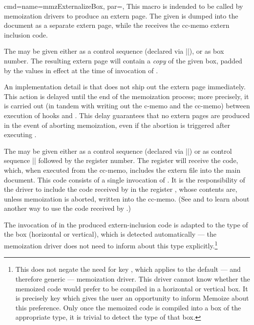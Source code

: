 \documentclass[a4paper,11pt]{article}
\begin{document}
\begin{doc}{
    cmd={name=mmzExternalizeBox, par=},
  }
  This macro is indended to be called by memoization drivers to produce an
  extern page.  The given  is dumped into the document as a separate
  extern page, while the  receives the cc-memo extern
  inclusion code.

  The  may be given either as a control sequence (declared via
  |\newbox|), or as box number.  The resulting extern page will contain a
  \emph{copy} of the given box, padded by the  values in effect
  at the time of invocation of .

  An implementation detail is that  does not ship out
  the extern page immediately.  This action is delayed until the end of the
  memoization process; more precisely, it is carried out (in tandem with
  writing out the c-memo and the cc-memo) between execution of hooks  and .  This delay guarantees
  that no extern pages are produced in the event of aborting memoization, even
  if the abortion is triggered after executing .
  
  The  may be given either as a control sequence (declared
  via |\newtoks|) or as control sequence |\toks| followed by the register
  number.  The register will receive the code, which, when executed from the
  cc-memo, includes the extern file into the main document.  This code consists
  of a single invocation of .  It is the
  responsibility of the driver to include the code received by  in the register , whose contents are, unless
  memoization is aborted, written into the cc-memo.  (See
   and  to learn about
  another way to use the code received by .)

  The invocation of  in the produced extern-inclusion
  code is adapted to the type of the box (horizontal or vertical), which is
  detected automatically --- the memoization driver does not need to inform
   about this type explicitly.\footnote{This does not
    negate the need for key , which applies to the default ---
    and therefore generic --- memoization driver.  This driver cannot know
    whether the memoized code would prefer to be compiled in a horizontal or
    vertical box.  It is precisely key  which gives the user an
    opportunity to inform Memoize about this preference.  Only once the
    memoized code is compiled into a box of the appropriate type, it is trivial
    to detect the type of that box.}
\end{doc}
\end{document}
